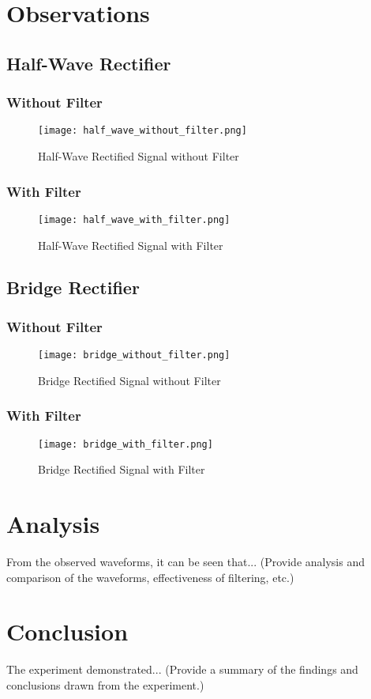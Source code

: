 \documentclass{article}
\begin{document}
\section{Observations}

\subsection{Half-Wave Rectifier}
\subsubsection{Without Filter}
\begin{figure}[H]
    \centering
    \texttt{[image: half\_wave\_without\_filter.png]}
    \caption{Half-Wave Rectified Signal without Filter}
\end{figure}

\subsubsection{With Filter}
\begin{figure}[H]
    \centering
    \texttt{[image: half\_wave\_with\_filter.png]}
    \caption{Half-Wave Rectified Signal with Filter}
\end{figure}

\subsection{Bridge Rectifier}
\subsubsection{Without Filter}
\begin{figure}[H]
    \centering
    \texttt{[image: bridge\_without\_filter.png]}
    \caption{Bridge Rectified Signal without Filter}
\end{figure}

\subsubsection{With Filter}
\begin{figure}[H]
    \centering
    \texttt{[image: bridge\_with\_filter.png]}
    \caption{Bridge Rectified Signal with Filter}
\end{figure}

\section{Analysis}
From the observed waveforms, it can be seen that...
(Provide analysis and comparison of the waveforms, effectiveness of filtering, etc.)

\section{Conclusion}
The experiment demonstrated...
(Provide a summary of the findings and conclusions drawn from the experiment.)
\end{document}
